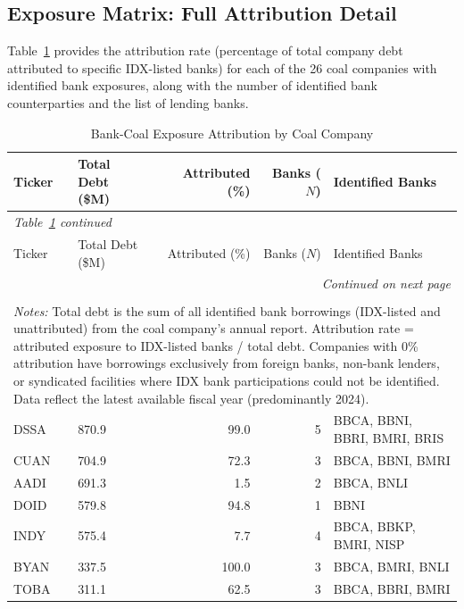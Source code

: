 \subsection{Exposure Matrix: Full Attribution Detail}
\label{subsec:exposure_detail}

Table~\ref{tab:exposure_attribution} provides the attribution rate (percentage of total company debt attributed to specific IDX-listed banks) for each of the 26 coal companies with identified bank exposures, along with the number of identified bank counterparties and the list of lending banks.

\begin{longtable}{p{1.2cm}p{4.5cm}rrp{4.5cm}}
\caption{Bank-Coal Exposure Attribution by Coal Company} \label{tab:exposure_attribution} \\
\toprule
Ticker & Total Debt (\$M) & Attributed (\%) & Banks ($N$) & Identified Banks \\
\midrule
\endfirsthead
\multicolumn{5}{l}{\textit{Table~\ref{tab:exposure_attribution} continued}} \\
\toprule
Ticker & Total Debt (\$M) & Attributed (\%) & Banks ($N$) & Identified Banks \\
\midrule
\endhead
\midrule
\multicolumn{5}{r}{\textit{Continued on next page}} \\
\endfoot
\bottomrule
\\[-6pt]
\multicolumn{5}{p{13.3cm}}{\footnotesize \textit{Notes:} Total debt is the sum of all identified bank borrowings (IDX-listed and unattributed) from the coal company's annual report. Attribution rate = attributed exposure to IDX-listed banks / total debt. Companies with 0\% attribution have borrowings exclusively from foreign banks, non-bank lenders, or syndicated facilities where IDX bank participations could not be identified. Data reflect the latest available fiscal year (predominantly 2024).} \\
\endlastfoot
DSSA  & 870.9 & 99.0 & 5 & BBCA, BBNI, BBRI, BMRI, BRIS \\
CUAN  & 704.9 & 72.3 & 3 & BBCA, BBNI, BMRI \\
AADI  & 691.3 & 1.5  & 2 & BBCA, BNLI \\
DOID  & 579.8 & 94.8 & 1 & BBNI \\
INDY  & 575.4 & 7.7  & 4 & BBCA, BBKP, BMRI, NISP \\
BYAN  & 337.5 & 100.0 & 3 & BBCA, BMRI, BNLI \\
TOBA  & 311.1 & 62.5 & 3 & BBCA, BBRI, BMRI \\

\end{longtable}
